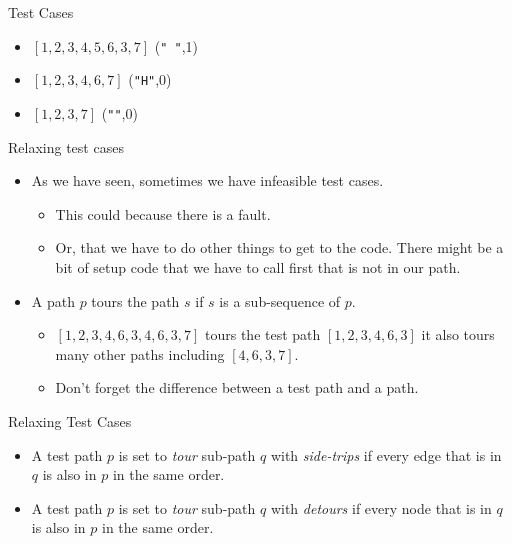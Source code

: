 \documentclass[handout]{beamer}
\begin{document}
\begin{frame}{Test Cases}
  \begin{itemize}
  \item $[1,2,3,4,5,6,3,7]$  ({\tt " "},1)
  \item $[1,2,3,4,6,7]$    ({\tt "H"},0)
  \item $[1,2,3,7]$       ({\tt ""},0)
  \end{itemize}
  \end{frame}

\begin{frame}{Relaxing test cases}
  \begin{itemize}
  \item As we have seen, sometimes we have infeasible  test cases. 
    \begin{itemize}
    \item This could because there is a fault.
    \item Or, that we have to do other things to get to the
      code. There might be a bit of setup code that we have to call
      first that is not in our path.
    \end{itemize}
  \item A path $p$ tours the path $s$ if $s$ is a sub-sequence of $p$.
    \begin{itemize}
    \item $[1,2,3,4,6,3,4,6,3,7]$ tours  the test path $[1,2,3,4,6,3]$ it
      also tours many other paths including $[4,6,3,7]$. 
    \item Don't forget the difference between a test path and a path.
    \end{itemize}
  \end{itemize}
    
\end{frame}
\begin{frame}{Relaxing Test Cases}
  \begin{itemize}
  \item A test path $p$ is set to {\em tour} sub-path $q$ with {\em
      side-trips} if every edge that is in $q$ is also in $p$ in the
    same order.
  \item A test path $p$ is set to {\em tour} sub-path $q$ with {\em
      detours} if every node that is in $q$ is also in $p$ in the
    same order.
  \end{itemize}
  
\end{frame}
\end{document}
